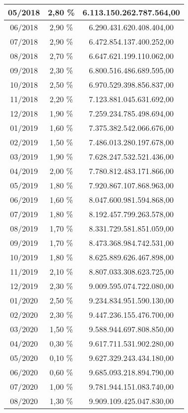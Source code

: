 \begin{center}
\begin{longtable}{|c|c|c|}
05/2018 & 2,80 \% & 6.113.150.262.787.564,00 \\ \hline
06/2018 & 2,90 \% & 6.290.431.620.408.404,00 \\ \hline
07/2018 & 2,90 \% & 6.472.854.137.400.252,00 \\ \hline
08/2018 & 2,70 \% & 6.647.621.199.110.062,00 \\ \hline
09/2018 & 2,30 \% & 6.800.516.486.689.595,00 \\ \hline
10/2018 & 2,50 \% & 6.970.529.398.856.837,00 \\ \hline
11/2018 & 2,20 \% & 7.123.881.045.631.692,00 \\ \hline
12/2018 & 1,90 \% & 7.259.234.785.498.694,00 \\ \hline
01/2019 & 1,60 \% & 7.375.382.542.066.676,00 \\ \hline
02/2019 & 1,50 \% & 7.486.013.280.197.678,00 \\ \hline
03/2019 & 1,90 \% & 7.628.247.532.521.436,00 \\ \hline
04/2019 & 2,00 \% & 7.780.812.483.171.866,00 \\ \hline
05/2019 & 1,80 \% & 7.920.867.107.868.963,00 \\ \hline
06/2019 & 1,60 \% & 8.047.600.981.594.868,00 \\ \hline
07/2019 & 1,80 \% & 8.192.457.799.263.578,00 \\ \hline
08/2019 & 1,70 \% & 8.331.729.581.851.059,00 \\ \hline
09/2019 & 1,70 \% & 8.473.368.984.742.531,00 \\ \hline
10/2019 & 1,80 \% & 8.625.889.626.467.898,00 \\ \hline
11/2019 & 2,10 \% & 8.807.033.308.623.725,00 \\ \hline
12/2019 & 2,30 \% & 9.009.595.074.722.080,00 \\ \hline
01/2020 & 2,50 \% & 9.234.834.951.590.130,00 \\ \hline
02/2020 & 2,30 \% & 9.447.236.155.476.700,00 \\ \hline
03/2020 & 1,50 \% & 9.588.944.697.808.850,00 \\ \hline
04/2020 & 0,30 \% & 9.617.711.531.902.280,00 \\ \hline
05/2020 & 0,10 \% & 9.627.329.243.434.180,00 \\ \hline
06/2020 & 0,60 \% & 9.685.093.218.894.790,00 \\ \hline
07/2020 & 1,00 \% & 9.781.944.151.083.740,00 \\ \hline
08/2020 & 1,30 \% & 9.909.109.425.047.830,00 \\ \hline

\end{longtable}
\end{center}
